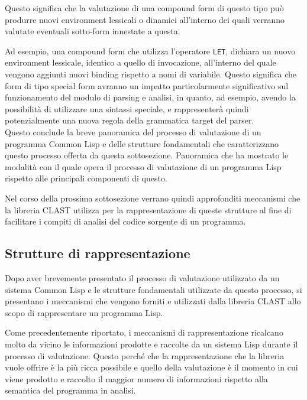 Questo significa che la valutazione di una compound form di questo tipo può
produrre nuovi environment lessicali o dinamici all’interno dei quali verranno
valutate eventuali sotto-form innestate a questa.

Ad esempio, una compound form che utilizza l’operatore \texttt{LET}, dichiara un
nuovo environment lessicale, identico a quello di invocazione, all’interno del
quale vengono aggiunti nuovi binding rispetto a nomi di variabile. Questo
significa che form di tipo special form avranno un impatto particolarmente
significativo sul funzionamento del modulo di parsing e analisi, in quanto, ad
esempio, avendo la possibilità di utilizzare una sintassi speciale, e
rappresenterà quindi potenzialmente una nuova regola della grammatica target del
parser.\\

Questo conclude la breve panoramica del processo di valutazione di un programma
Common Lisp e delle strutture fondamentali che caratterizzano questo processo
offerta da questa sottosezione. Panoramica che ha mostrato le modalità con il
quale opera il processo di valutazione di un programma Lisp rispetto alle
principali componenti di questo.

Nel corso della prossima sottosezione verrano quindi approfonditi meccanismi che
la libreria CLAST utilizza per la rappresentazione di queste strutture al fine
di facilitare i compiti di analisi del codice sorgente di un programma.

\subsection{Strutture di rappresentazione}

Dopo aver brevemente presentato il processo di valutazione utilizzato da un
sistema Common Lisp e le strutture fondamentali utilizzate da questo processo,
si presentano i meccanismi che vengono forniti e utilizzati dalla libreria CLAST
allo scopo di rappresentare un programma Lisp.

Come precedentemente riportato, i meccanismi di rappresentazione ricalcano
molto da vicino le informazioni prodotte e raccolte da un sistema Lisp durante
il processo di valutazione. Questo perché che la rappresentazione che la
libreria vuole offrire è la più ricca possibile e quello della valutazione è
il momento in cui viene prodotto e raccolto il maggior numero di informazioni
rispetto alla semantica del programma in analisi.\\

